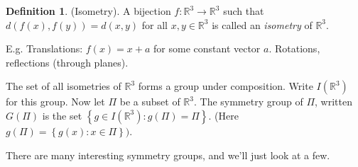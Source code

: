 \documentclass{article}
\theoremstyle{definition} \newtheorem*{definition}{Definition}
\newcommand{\reals}{\mathbb{R}} \newcommand{\rationals}{\mathbb{Q}}
\begin{document}
  \begin{definition} (Isometry). A bijection $f:\reals^3 \rightarrow \reals^3$
    such that $d(f(x),f(y))=d(x,y)$ for all $x,y \in \reals^3$ is called an
    \textit{isometry} of $\reals^3$.  \end{definition}

  E.g. Translations: $f(x)=x+a$ for some constant vector $a$. Rotations,
  reflections (through planes). 

  The set of all isometries of $\reals^3$ forms a group under composition.
  Write $I(\reals^3)$ for this group. Now let $\Pi$ be a subset of $\reals^3$.
  The symmetry group of $\Pi$, written $G(\Pi)$ is the set $\left\{ g \in
  I(\reals^3):g(\Pi) = \Pi \right\}$. (Here $g(\Pi)=\left\{  g(x):x \in \Pi
  \right\})$.

  There are many interesting symmetry groups, and we'll just look at a few. \\
\end{document}

